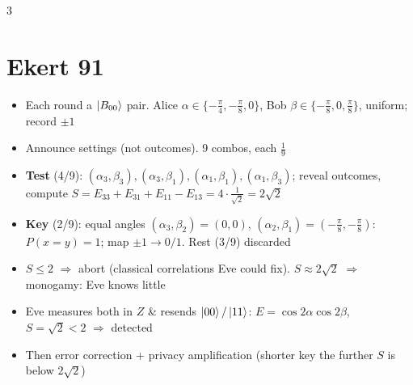 \documentclass[10pt]{article}
\newcommand{\B}[1]{\ket{B_{#1}}}
\begin{document}
\begin{multicols*}{3}
\section{Ekert 91}
\begin{itemize}
  \item Each round a $\B{00}$ pair. Alice $\alpha\in\{-\tfrac\pi4,-\tfrac\pi8,0\}$, Bob $\beta\in\{-\tfrac\pi8,0,\tfrac\pi8\}$, uniform; record $\pm1$
  \item Announce settings (not outcomes). 9 combos, each $\tfrac19$
  \item \textbf{Test} (4/9): $(\alpha_3,\beta_3),(\alpha_3,\beta_1),(\alpha_1,\beta_1),(\alpha_1,\beta_3)$; reveal outcomes, compute $S=E_{33}+E_{31}+E_{11}-E_{13}=4\cdot\tfrac1{\sqrt2}=2\sqrt2$
  \item \textbf{Key} (2/9): equal angles $(\alpha_3,\beta_2)=(0,0)$, $(\alpha_2,\beta_1)=(-\tfrac\pi8,-\tfrac\pi8)$: $P(x{=}y)=1$; map $\pm1\to0/1$. Rest (3/9) discarded
  \item $S\le2$ $\Rightarrow$ abort (classical correlations Eve could fix). $S\approx2\sqrt2$ $\Rightarrow$ monogamy: Eve knows little
  \item Eve measures both in $Z$ \& resends $\ket{00}/\ket{11}$: $E=\cos2\alpha\cos2\beta$, $S=\sqrt2<2$ $\Rightarrow$ detected
  \item Then error correction + privacy amplification (shorter key the further $S$ is below $2\sqrt2$)
\end{itemize}


\end{multicols*}
\end{document}
